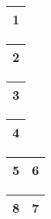 \begin{frame}
\begin{table}
\begin{tabular}{| c |}
\hline
\cellcolor{blue!25}1\\ 
\hline
\end{tabular}
\quad
\begin{tabular}{| c |}
\hline
2\\ 
\hline
\end{tabular}
\quad
\begin{tabular}{| c |}
\hline
\cellcolor{blue!25}3\\ 
\hline
\end{tabular}
\quad
\begin{tabular}{| c |}
\hline
4 \\ 
\hline
\end{tabular}
\quad
\begin{tabular}{| c | c |}
\hline
\cellcolor{blue!25}5 & \cellcolor{blue!25}6\\ 
\hline
\end{tabular}
\quad
\begin{tabular}{| c | c |}
\hline
8 & 7 \\ 
\hline
\end{tabular}
\end{table}
\end{frame}


